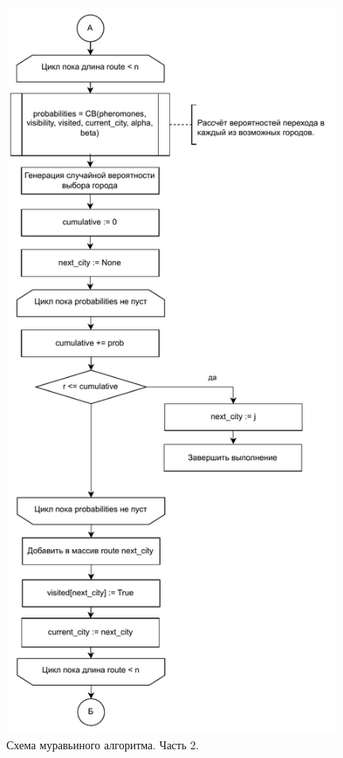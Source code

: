 \begin{figure}[H]
    \centering
    \includegraphics[width=110mm]{images/ant_2}
    \caption{Схема муравьиного алгоритма. Часть 2.}
    \label{images:ant_2}
\end{figure}

